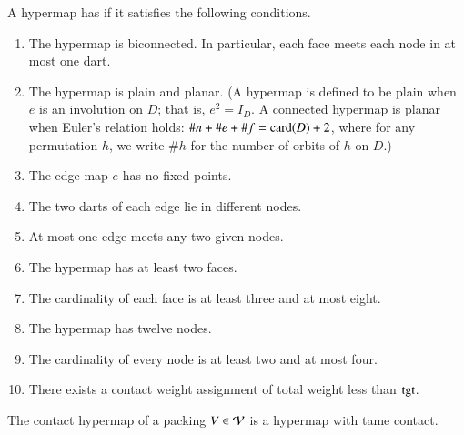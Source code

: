 \documentclass{llncs}
\def\op#1{{\hbox{#1}}}
\begin{document}
\begin{definition}
  A hypermap has  if it satisfies the following 
  conditions.
%
%
%
%
%
%
%
%
%
\begin{enumerate}
\item {} The hypermap is biconnected.  In particular,
  each face meets each node in at most one dart.
\item {} The hypermap is plain and planar.  (A hypermap is defined
to be plain when $e$ is an involution on $D$; that is, $e^2 = I_D$. A connected hypermap
is planar when Euler's relation holds: $\#n + \#e + \#f = \card(D) + 2$, where 
for any permutation $h$, we write $\#h$ for
the number of orbits of $h$ on $D$.)
\item {} The edge map $e$ has no fixed points.
\item {} The two darts of each edge lie in different
  nodes.
\item {} At most one edge meets any two given
  nodes.
\item {} The hypermap has at least two faces.
\item {} The cardinality of each face is at least three
  and at most eight.
\item {} The hypermap has twelve nodes.
\item {} The cardinality of every node is at least two  and at most four.
\item {} There exists a contact weight assignment of total
  weight less than $\op{tgt}$.
\end{enumerate}
%
\end{definition}



\begin{theorem} The contact hypermap of a 
  packing $V\in {\mathcal V}$ is a hypermap with tame contact.
\end{theorem}
%
%
%
\end{document}
